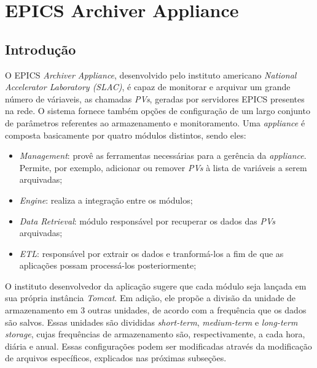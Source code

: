 \section {EPICS Archiver Appliance}
\label{sec:archiver}
\subsection {Introdução}

O EPICS \textit{Archiver Appliance}, desenvolvido pelo instituto americano
\textit{National Accelerator Laboratory (SLAC)}, é capaz de monitorar e arquivar
um grande número de váriaveis, as chamadas \textit{PVs}, geradas por servidores
EPICS presentes na rede. O sistema fornece também opções de configuração de um
largo conjunto de parâmetros referentes ao armazenamento e monitoramento. Uma
\textit{appliance} é composta basicamente por quatro módulos distintos, sendo eles:

\begin{itemize}
  \renewcommand\labelitemi{--}
  \item \textit{Management}: provê as ferramentas necessárias para a gerência
  da \textit{appliance}. Permite, por exemplo, adicionar ou remover \textit{PVs}
  à lista de variáveis a serem arquivadas;
  \item \textit{Engine}: realiza a integração entre os módulos;
  \item \textit{Data Retrieval}: módulo responsável por recuperar os dados das
  \textit{PVs} arquivadas;
  \item \textit{ETL}: responsável por extrair os dados e tranformá-los a fim de
  que as aplicações possam processá-los posteriormente;
\end{itemize}

% 
%     

O instituto desenvolvedor da aplicação sugere que cada módulo seja lançada em
sua própria instância \textit{Tomcat}. Em adição, ele propõe a divisão da
unidade de armazenamento em 3 outras unidades, de acordo com a frequência que os
dados são salvos. Essas unidades são divididas \textit{short-term},
\textit{medium-term} e \textit{long-term storage}, cujas frequências de
armazenamento são, respectivamente, a cada hora, diária e anual. Essas
configurações podem ser modificadas através da modificação de arquivos
específicos, explicados nas próximas subseções.

